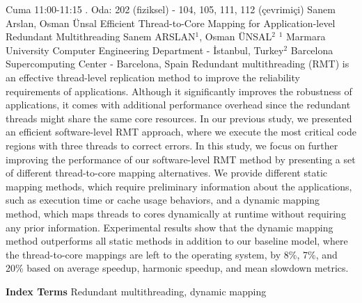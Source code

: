 
    \begin{abstract_basarim}
    {Cuma 11:00-11:15}
    {.}
    {Oda: 202 (fiziksel) - 104, 105, 111, 112 (çevrimiçi)}
    {Sanem Arslan, Osman Ünsal}
    {Efficient Thread-to-Core Mapping for Application-level Redundant Multithreading}
    {%
    Sanem ARSLAN$^{1}$, Osman ÜNSAL$^{2}$}
    {%
    }
    {%
    $^1$ Marmara University Computer Engineering Department - İstanbul, Turkey\newline{}$^2$ Barcelona Supercomputing Center - Barcelona, Spain}
    Redundant multithreading (RMT) is an effective thread-level replication method to improve the reliability requirements of applications. Although it significantly improves the robustness of applications, it comes with additional performance overhead since the redundant threads might share the same core resources. In our previous study, we presented an efficient software-level RMT approach, where we execute the most critical code regions with three threads to correct errors. In this study, we focus on further improving the performance of our software-level RMT method by presenting a set of different thread-to-core mapping alternatives. We provide different static mapping methods, which require preliminary information about the applications, such as execution time or cache usage behaviors, and a dynamic mapping method, which maps threads to cores dynamically at runtime without requiring any prior information. Experimental results show that the dynamic mapping method outperforms all static methods in addition to our baseline model, where the thread-to-core mappings are left to the operating system, by 8\%, 7\%, and 20\% based on average speedup, harmonic speedup, and mean slowdown metrics. 
    
            \textbf{Index Terms} \newline{}Redundant multithreading, dynamic mapping
    \end{abstract_basarim}
    